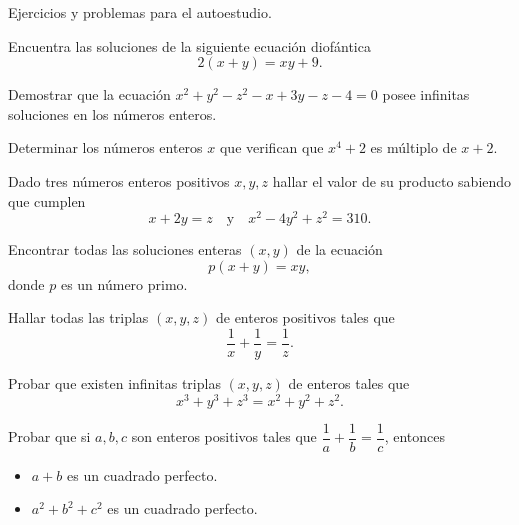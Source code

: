 Ejercicios y problemas para el autoestudio.

\begin{exercise}
    Encuentra las soluciones de la siguiente ecuación diofántica
    \[
        2(x + y) = xy + 9.
    \]
\end{exercise}

\begin{exercise}
    Demostrar que la ecuación $x^2 + y^2 - z^2 - x + 3y - z - 4 = 0$ posee infinitas soluciones en los números enteros.
\end{exercise}

\begin{exercise}
    Determinar los números enteros $x$ que verifican que $x^4 + 2$ es múltiplo de $x + 2$.
\end{exercise}

\begin{exercise}
    Dado tres números enteros positivos $x,y,z$ hallar el valor de su producto sabiendo que cumplen
    \[
        x + 2y = z \quad \text{y} \quad x^2 - 4y^2 + z^2 = 310.
    \]
\end{exercise}

\begin{exercise}
    Encontrar todas las soluciones enteras $(x,y)$ de la ecuación
    \[
        p(x + y) = xy,
    \]
    donde $p$ es un número primo.
\end{exercise}

\begin{exercise}
    Hallar todas las triplas $(x,y,z)$ de enteros positivos tales que
    \[
        \frac{1}{x} + \frac{1}{y} = \frac{1}{z}.
    \]
\end{exercise}

\begin{exercise}
    Probar que existen infinitas triplas $(x,y,z)$ de enteros tales que
    \[
        x^3 + y^3 + z^3 = x^2 + y^2 + z^2.
    \]
\end{exercise}

\begin{problem}
    Probar que si $a,b,c$ son enteros positivos tales que $\dfrac{1}{a} + \dfrac{1}{b} = \dfrac{1}{c}$, entonces
    \begin{itemize}
        \item $a + b$ es un cuadrado perfecto.
        \item $a^2 + b^2 + c^2$ es un cuadrado perfecto.
    \end{itemize}
\end{problem}



